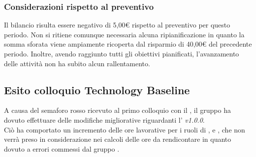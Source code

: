 \subsubsection{Considerazioni rispetto al preventivo} \label{subsubsection:considerazioni_finali_PoC}
Il bilancio risulta essere negativo di 5,00€ rispetto al preventivo per questo periodo.
Non si ritiene comunque necessaria alcuna ripianificazione in quanto la somma sforata viene ampiamente ricoperta dal risparmio di 40,00€ del precedente periodo.
Inoltre, avendo raggiunto tutti gli obiettivi pianificati, l'avanzamento delle attività non ha subito alcun rallentamento.

\vspace{1cm}

\subsection{Esito colloquio Technology Baseline} \label{subsubsection:esito_TB}
A causa del semaforo rosso ricevuto al primo colloquio con il \commitNameS{}, il gruppo ha dovuto effettuare delle modifiche migliorative riguardanti l'\docNameAdR{} \textit{v1.0.0}.\\
Ciò ha comportato un incremento delle ore lavorative per i ruoli di \roleAnalystLow{}, \roleVerifierLow{} e \roleProjectManagerLow{}, che non verrà preso in considerazione nei calcoli delle ore da rendicontare in quanto dovuto a errori commessi dal gruppo \groupName{}.

\vspace{2cm}



